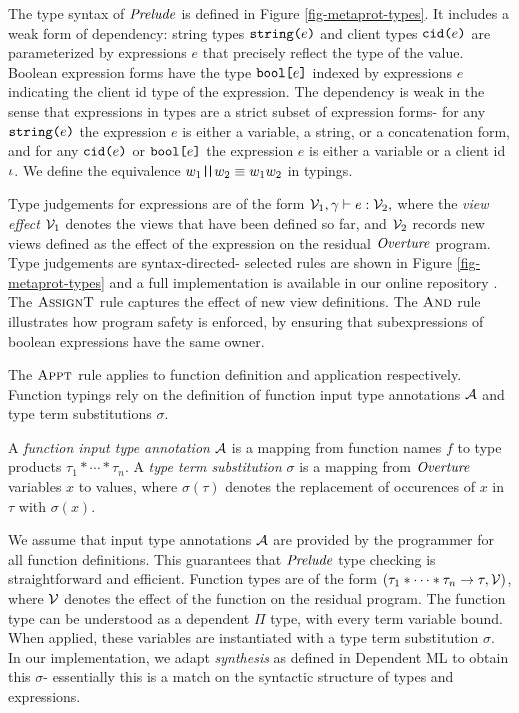 The type syntax of $\mathit{Prelude}$ is defined in Figure
\ref{fig-metaprot-types}. It includes a weak form of dependency:
string types $\texttt{string(}e\texttt{)}$ and client types $\texttt{cid(}e\texttt{)}$
are parameterized by expressions $e$ that precisely reflect the
type of the value. Boolean expression forms have the type
$\texttt{bool[}e\texttt{]}$ indexed by expressions $e$ indicating the client
id type of the expression. The dependency is weak in the
sense that expressions in types are a strict subset of
expression forms- for any $\texttt{string(}e\texttt{)}$ the expression $e$
is either a variable, a string, or a concatenation form,
and for any $\texttt{cid(}e\texttt{)}$ or $\texttt{bool[}e\texttt{]}$ the expression $e$
is either a variable or a client id $\iota$. We define
the equivalence $w_1 \texttt{|\!|} w_2 \equiv w_1w_2$ in typings. 

Type judgements for expressions are of the form
$\tjudge{\viewst_1}{\gamma}{e}{\viewst_2}$ where the \emph{view
effect} $\mathcal{V}_1$ denotes the views that have been defined so far,
and $\mathcal{V}_2$ records new views defined as the effect of the
expression on the residual $\mathit{Overture}$ program.  Type judgements are
syntax-directed- selected rules are shown in Figure
\ref{fig-metaprot-types}
and a full implementation is available in our online repository \cite{jpdf-github}. The
$\text{\sc AssignT}$ rule captures the effect of new view
definitions. The $\text{\sc And}$ rule illustrates how program safety
is enforced, by ensuring that subexpressions of boolean expressions
have the same owner.

The $\text{\sc Appt}$ rule applies to function
definition and application respectively. Function typings rely on the
definition of function input type annotations $\mathcal{A}$ and
type term substitutions $\sigma$. 
\begin{definition}
  A \emph{function input type annotation} $\mathcal{A}$ is a mapping from
  function names $f$ to type products $\tau_1 * \cdots * \tau_n$.
  A \emph{type term substitution} $\sigma$ is a mapping from
  $\mathit{Overture}$ variables $x$ to values, where $\sigma(\tau)$ denotes
  the replacement of occurences of $x$ in $\tau$ with $\sigma(x)$. 
\end{definition}
We assume that input type annotations $\mathcal{A}$ are provided by the
programmer for all function definitions. This guarantees that
$\mathit{Prelude}$ type checking is straightforward and efficient.
Function types are of the form
$
(\tau_1 * \cdots * \tau_n \rightarrow \tau,\mathcal{V})
$,
where $\mathcal{V}$ denotes the effect of the function on the residual
program.  The function type can be understood as a dependent $\Pi$
type, with every term variable bound. When applied, these variables
are instantiated with a type term substitution $\sigma$. In our
implementation, we adapt \emph{synthesis} as defined in Dependent ML \cite{10.1145/292540.292560}
to obtain this $\sigma$- essentially this is a match on the syntactic
structure of types and expressions. 

